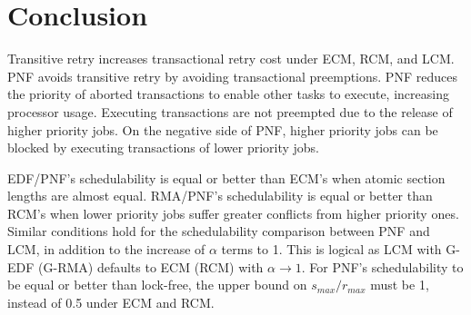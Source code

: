 \section{Conclusion}\label{pnf_conclusion}

Transitive retry increases transactional retry cost under ECM, RCM, and LCM. PNF avoids transitive retry by avoiding   transactional preemptions. PNF reduces the priority of aborted transactions to enable other tasks to execute, increasing processor usage. Executing transactions are not preempted due to the release of higher priority jobs. On the negative side of PNF, higher priority jobs can be blocked by executing transactions of lower priority jobs. 

EDF/PNF's schedulability is equal or better than ECM's when atomic section lengths are almost equal. RMA/PNF's schedulability is equal or better than RCM's when lower priority jobs suffer greater conflicts from higher priority ones. Similar conditions hold for the schedulability comparison between PNF and LCM, in addition to the increase of $\alpha$ terms to 1. This is logical as LCM with G-EDF (G-RMA) defaults to ECM (RCM) with $\alpha\rightarrow 1$. For PNF's schedulability to be equal or better than lock-free, the upper bound on $s_{max}/r_{max}$ must be 1, instead of 0.5 under ECM and RCM. 